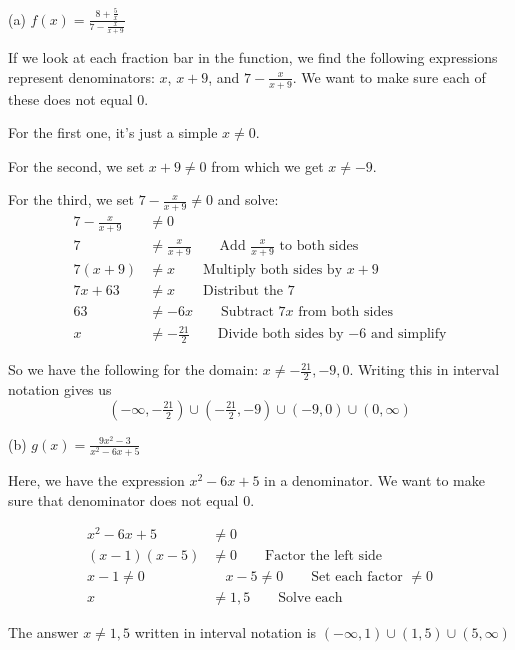 \begin{solution}
(a) $f(x) = \frac{8 + \frac{5}{x}}{7-\frac{x}{x+9}}$ \newline 

If we look at each fraction bar in the function, we find the following expressions represent denominators: $x$, $x+9$, and $7-\frac{x}{x+9}$. We want to make sure each of these does not equal 0. \newline 

For the first one, it's just a simple $x \neq 0$. \newline 

For the second, we set $x + 9 \neq 0$ from which we get $x \neq -9$. \newline 

For the third, we set $7 - \frac{x}{x+9} \neq 0$ and solve:
\begin{align*}
	7 - \frac{x}{x+9} &\neq 0 \\
	7 &\neq \frac{x}{x+9} \qquad \text{Add $\frac{x}{x+9}$ to both sides} \\
	7(x+9) &\neq x \qquad \text{Multiply both sides by $x+9$} \\
	7x + 63 &\neq x \qquad \text{Distribut the 7} \\
	63 &\neq -6x \qquad \text{Subtract $7x$ from both sides} \\
	x &\neq -\frac{21}{2} \qquad \text{Divide both sides by $-6$ and simplify} 
\end{align*}

So we have the following for the domain: $x \neq -\frac{21}{2}, -9, 0$. Writing this in interval notation gives us \[\left(-\infty, -\tfrac{21}{2}\right) \cup \left(-\tfrac{21}{2}, -9\right) \cup (-9, 0) \cup (0, \infty)\]

(b) $g(x) = \frac{9x^2-3}{x^2 - 6x + 5}$ \newline

Here, we have the expression $x^2 - 6x + 5$ in a denominator. We want to make sure that denominator does not equal 0.

\begin{align*}
x^2 - 6x + 5 &\neq 0 \\
(x-1)(x-5) &\neq 0 \qquad \text{Factor the left side} \\
x-1 \neq 0 \quad & \quad x -5\neq 0 \qquad \text{Set each factor $\neq 0$} \\
x &\neq 1, 5 \qquad \text{Solve each}
\end{align*}

The answer $x \neq 1, 5$ written in interval notation is $(-\infty, 1) \cup (1, 5) \cup (5, \infty)$ \newline\\


\end{solution}
